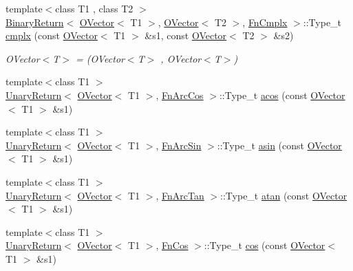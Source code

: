 \begin{DoxyCompactItemize}
\item 
{\footnotesize template$<$class T1 , class T2 $>$ }\\\mbox{\hyperlink{structENSEM_1_1BinaryReturn}{Binary\+Return}}$<$ \mbox{\hyperlink{classENSEM_1_1OVector}{O\+Vector}}$<$ T1 $>$, \mbox{\hyperlink{classENSEM_1_1OVector}{O\+Vector}}$<$ T2 $>$, \mbox{\hyperlink{structENSEM_1_1FnCmplx}{Fn\+Cmplx}} $>$\+::Type\+\_\+t \mbox{\hyperlink{group__obsvector_ga363734253f08749647255a90c647284c}{cmplx}} (const \mbox{\hyperlink{classENSEM_1_1OVector}{O\+Vector}}$<$ T1 $>$ \&s1, const \mbox{\hyperlink{classENSEM_1_1OVector}{O\+Vector}}$<$ T2 $>$ \&s2)
\begin{DoxyCompactList}\small\item\em O\+Vector$<$\+T$>$ = (O\+Vector$<$\+T$>$ , O\+Vector$<$\+T$>$) \end{DoxyCompactList}\item 
{\footnotesize template$<$class T1 $>$ }\\\mbox{\hyperlink{structENSEM_1_1UnaryReturn}{Unary\+Return}}$<$ \mbox{\hyperlink{classENSEM_1_1OVector}{O\+Vector}}$<$ T1 $>$, \mbox{\hyperlink{structENSEM_1_1FnArcCos}{Fn\+Arc\+Cos}} $>$\+::Type\+\_\+t \mbox{\hyperlink{group__obsvector_ga3b0e5ce4d5c52455bce825cd795a0363}{acos}} (const \mbox{\hyperlink{classENSEM_1_1OVector}{O\+Vector}}$<$ T1 $>$ \&s1)
\item 
{\footnotesize template$<$class T1 $>$ }\\\mbox{\hyperlink{structENSEM_1_1UnaryReturn}{Unary\+Return}}$<$ \mbox{\hyperlink{classENSEM_1_1OVector}{O\+Vector}}$<$ T1 $>$, \mbox{\hyperlink{structENSEM_1_1FnArcSin}{Fn\+Arc\+Sin}} $>$\+::Type\+\_\+t \mbox{\hyperlink{group__obsvector_ga90cc9607dddfb6dc09c58de601982b10}{asin}} (const \mbox{\hyperlink{classENSEM_1_1OVector}{O\+Vector}}$<$ T1 $>$ \&s1)
\item 
{\footnotesize template$<$class T1 $>$ }\\\mbox{\hyperlink{structENSEM_1_1UnaryReturn}{Unary\+Return}}$<$ \mbox{\hyperlink{classENSEM_1_1OVector}{O\+Vector}}$<$ T1 $>$, \mbox{\hyperlink{structENSEM_1_1FnArcTan}{Fn\+Arc\+Tan}} $>$\+::Type\+\_\+t \mbox{\hyperlink{group__obsvector_ga1e6e98a68854c39f8ca545ad8dbe328d}{atan}} (const \mbox{\hyperlink{classENSEM_1_1OVector}{O\+Vector}}$<$ T1 $>$ \&s1)
\item 
{\footnotesize template$<$class T1 $>$ }\\\mbox{\hyperlink{structENSEM_1_1UnaryReturn}{Unary\+Return}}$<$ \mbox{\hyperlink{classENSEM_1_1OVector}{O\+Vector}}$<$ T1 $>$, \mbox{\hyperlink{structENSEM_1_1FnCos}{Fn\+Cos}} $>$\+::Type\+\_\+t \mbox{\hyperlink{group__obsvector_ga723a9a3fcfd45943398e215f7702a7a2}{cos}} (const \mbox{\hyperlink{classENSEM_1_1OVector}{O\+Vector}}$<$ T1 $>$ \&s1)

\end{DoxyCompactItemize}
